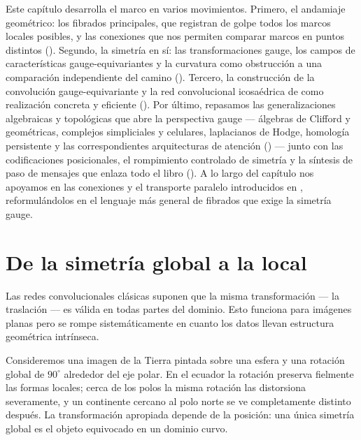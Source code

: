 Este cap\'itulo desarrolla el marco en varios movimientos. Primero, el andamiaje
geom\'etrico: los fibrados principales, que registran de golpe todos los marcos
locales posibles, y las conexiones que nos permiten comparar marcos en puntos
distintos (). Segundo, la simetr\'ia
en s\'i: las transformaciones gauge, los campos de caracter\'isticas
gauge-equivariantes y la curvatura como obstrucci\'on a una comparaci\'on
independiente del camino
(). Tercero, la construcci\'on de la
convoluci\'on gauge-equivariante y la red convolucional icosa\'edrica de
\citet{cohen2019gaugeequivariantconvolutional} como realizaci\'on concreta y
eficiente (). Por \'ultimo, repasamos las generalizaciones
algebraicas y topol\'ogicas que abre la perspectiva gauge --- \'algebras de
Clifford y geom\'etricas, complejos simpliciales y celulares, laplacianos de
Hodge, homolog\'ia persistente y las correspondientes arquitecturas de
atenci\'on () --- junto con las
codificaciones posicionales, el rompimiento controlado de simetr\'ia y la
s\'intesis de paso de mensajes que enlaza todo el libro
(). A lo largo del cap\'itulo nos
apoyamos en las conexiones y el transporte paralelo introducidos en
, reformul\'andolos en el lenguaje m\'as general de fibrados
que exige la simetr\'ia gauge.

\section{De la simetr\'ia global a la local}
\label{sec:gauge:local}

Las redes convolucionales cl\'asicas suponen que la misma transformaci\'on ---
la traslaci\'on --- es v\'alida en todas partes del dominio. Esto funciona para
im\'agenes planas pero se rompe sistem\'aticamente en cuanto los datos llevan
estructura geom\'etrica intr\'inseca.

\begin{example}
\label{ex:gauge:sphere-rotation}
Consideremos una imagen de la Tierra pintada sobre una esfera y una rotaci\'on
global de $90^\circ$ alrededor del eje polar. En el ecuador la rotaci\'on
preserva fielmente las formas locales; cerca de los polos la misma rotaci\'on las
distorsiona severamente, y un continente cercano al polo norte se ve
completamente distinto despu\'es. La transformaci\'on apropiada depende de la
posici\'on: una \'unica simetr\'ia global es el objeto equivocado en un dominio
curvo.
\end{example}

